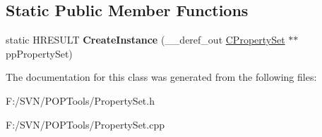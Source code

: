 \subsection*{Static Public Member Functions}
\begin{DoxyCompactItemize}
\item 
\hypertarget{class_c_property_set_a7bba3def0c954a4fe0cff27f056a3607}{static H\-R\-E\-S\-U\-L\-T {\bfseries Create\-Instance} (\-\_\-\-\_\-deref\-\_\-out \hyperlink{class_c_property_set}{C\-Property\-Set} $\ast$$\ast$pp\-Property\-Set)}\label{class_c_property_set_a7bba3def0c954a4fe0cff27f056a3607}

\end{DoxyCompactItemize}


The documentation for this class was generated from the following files\-:\begin{DoxyCompactItemize}
\item 
F\-:/\-S\-V\-N/\-P\-O\-P\-Tools/Property\-Set.\-h\item 
F\-:/\-S\-V\-N/\-P\-O\-P\-Tools/Property\-Set.\-cpp\end{DoxyCompactItemize}
